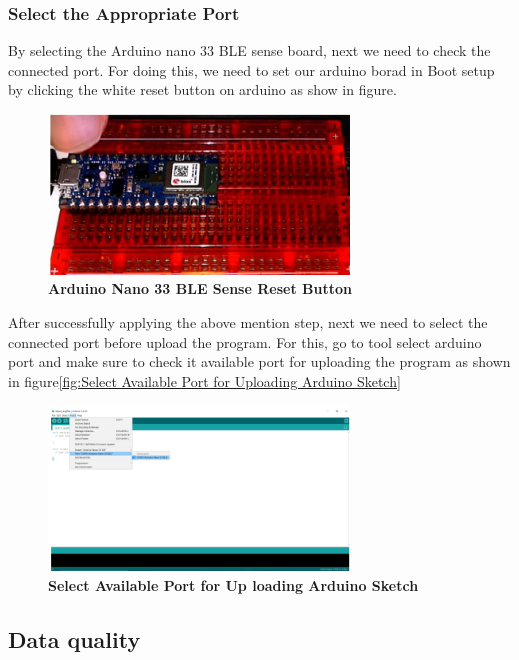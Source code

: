 \subsubsection{Select the Appropriate Port}
By selecting the Arduino nano 33 BLE sense board, next we need to check the connected port. For doing this, we need to set our arduino borad in Boot setup by clicking the white reset button on arduino as show in figure.

\begin{figure}[H]\centering
	\includegraphics[width=8cm]{Images/software/ArduinoNano33BLESenseResetButton}
	\caption{\textbf{Arduino Nano 33 BLE Sense Reset Button}}
	\label{fig:ArduinoNano33BLESenseResetButton}		
\end{figure}


After successfully applying the above mention step, next we need to select the connected
port before upload the program. For this, go to tool select arduino port and make
sure to check it available port for uploading the program as shown in figure\ref{fig:Select Available Port for Uploading Arduino Sketch}

\begin{figure}[H]\centering
	\includegraphics[width=8cm]{Images/software/SelectAvailablePortforUploadingArduinoSketch}
	\caption{\textbf{Select Available Port for Up loading Arduino Sketch}}
	\label{fig:SelectAvailablePortforUploadingArduinoSketch}		
\end{figure}

\subsection{Data quality}

